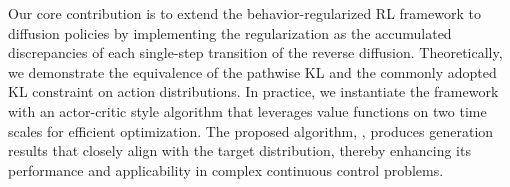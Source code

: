 Our core contribution is to extend the behavior-regularized RL framework to diffusion policies by implementing the regularization as the accumulated discrepancies of each single-step transition of the reverse diffusion. Theoretically, we demonstrate the equivalence of the pathwise KL and the commonly adopted KL constraint on action distributions. In practice, we instantiate the framework with an actor-critic style algorithm that leverages value functions on two time scales for efficient optimization. The proposed algorithm, \algbb, produces generation results that closely align with the target distribution, thereby enhancing its performance and applicability in complex continuous control problems.

